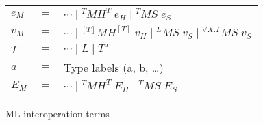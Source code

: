 \begin{figure}
\begin{center}
\begin{tabular}{lcl}
$e_{M}$ & $=$ & $\cdots\;\vert\;^{T}MH^{T}\;e_{H}\;\vert\;^{T}MS\;e_{S}$ \\
$v_{M}$ & $=$ & $\cdots\;\vert\;^{[T]}MH^{[T]}\;v_{H}\;\vert\;^{L}MS\;v_{S}\;\vert\;^{\forall X.T}MS\;v_{S}$ \\
$T$ & $=$ & $\cdots\;\vert\;L\;\vert\;T^{a}$ \\
$a$ & $=$ & Type labels (a, b, \ldots) \\
$E_{M}$ & $=$ & $\cdots\;\vert\;^{T}MH^{T}\;E_{H}\;\vert\;^{T}MS\;E_{S}$
\end{tabular}
\end{center}
\caption{ML interoperation terms}
\label{fig:mit}
\end{figure}